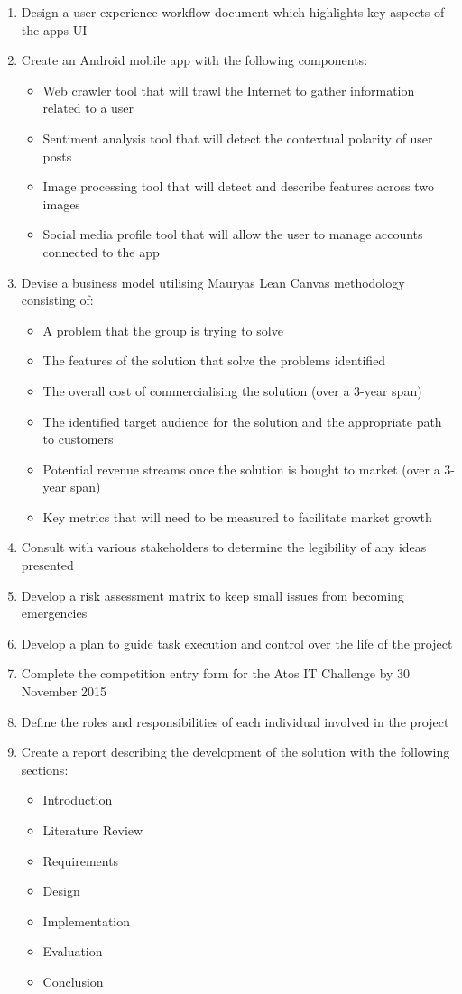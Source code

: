 \begin{enumerate}
	\item Design a user experience workflow document which highlights key aspects of the app\textsc{}s UI
	\item Create an Android mobile app with the following components:
		\begin{itemize}
			\item Web crawler tool that will trawl the Internet to gather information related to a user
			\item Sentiment analysis tool that will detect the contextual polarity of user posts
			\item Image processing tool that will detect and describe features across two images
			\item Social media profile tool that will allow the user to manage accounts connected to the app
		\end{itemize}
	\item Devise a business model utilising Maurya\textsc{}s Lean Canvas methodology consisting of:
		\begin{itemize}
			\item A problem that the group is trying to solve
			\item The features of the solution that solve the problems identified 
			\item The overall cost of commercialising the solution (over a 3-year span)
			\item The identified target audience for the solution and the appropriate path to customers
			\item Potential revenue streams once the solution is bought to market (over a 3-year span)
			\item Key metrics that will need to be measured to facilitate market growth
		\end{itemize}
	\item Consult with various stakeholders to determine the legibility of any ideas presented
	\item Develop a risk assessment matrix to keep small issues from becoming emergencies
	\item Develop a plan to guide task execution and control over the life of the project
	\item Complete the competition entry form for the Atos IT Challenge by 30 November 2015
	\item Define the roles and responsibilities of each individual involved in the project 
	\item Create a report describing the development of the solution with the following sections:
		\begin{itemize}
			\item Introduction
			\item Literature Review
			\item Requirements
			\item Design
			\item Implementation
			\item Evaluation
			\item Conclusion
		\end{itemize}
\end{enumerate}

